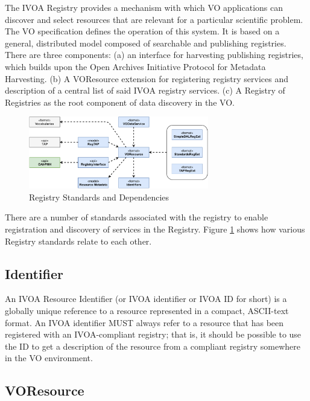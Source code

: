 \documentclass[11pt,a4paper]{ivoa}
\begin{document}
The IVOA Registry provides a mechanism with which VO applications can discover and select 
resources that are relevant for a particular scientific problem. The VO specification defines 
the operation of this system. It is based on a general, distributed model composed of searchable 
and publishing registries. There are three components: (a) an interface for harvesting publishing 
registries, which builds upon the Open Archives Initiative Protocol for Metadata Harvesting. 
(b) A VOResource extension for registering registry services and description of a central list 
of said IVOA registry services. (c) A Registry of Registries as the root component of data discovery 
in the VO. 

\begin{figure}[h]
\centering
\includegraphics[width=0.70\textwidth]{ivoa-arch-registry.pdf}
\caption{Registry Standards and Dependencies}
\label{fig:regdeps}
\end{figure}

There are a number of standards associated with the registry to enable registration and discovery 
of services in the Registry.  Figure \ref{fig:regdeps} shows how various Registry standards relate to each other.

\subsection{Identifier}

An IVOA Resource Identifier (or IVOA identifier or IVOA ID for short) \citep{2016ivoa.spec.0523D} is a globally unique reference 
to a resource represented in a compact, ASCII-text format.  An IVOA identifier MUST always refer to 
a resource that has been registered with an IVOA-compliant registry; that is, it should be possible 
to use the ID to get a description of the resource from a compliant registry somewhere in the VO 
environment.

\subsection{VOResource}
\end{document}
